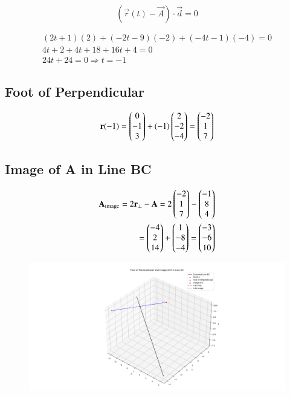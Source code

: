 \documentclass{article}
\begin{document}
$$(\vec{r}(t) - \vec{A}) \cdot \vec{d} = 0$$

\begin{align}
(2t + 1)(2) + (-2t - 9)(-2) + (-4t - 1)(-4) = 0 \\
4t + 2 + 4t + 18 + 16t + 4 = 0 \\
24t + 24 = 0 \Rightarrow t = -1
\end{align}

\subsection*{Foot of Perpendicular}
\begin{align}
\mathbf{r}(-1) = 
\begin{pmatrix}0 \\ -1 \\ 3\end{pmatrix}
+ (-1)
\begin{pmatrix}2 \\ -2 \\ -4\end{pmatrix}
=
\begin{pmatrix}-2 \\ 1 \\ 7\end{pmatrix}
\end{align}

\subsection*{Image of A in Line BC}
\begin{align}
\mathbf{A}_{\text{image}} = 2\mathbf{r}_{\perp} - \mathbf{A} =
2
\begin{pmatrix}-2 \\ 1 \\ 7\end{pmatrix}
-
\begin{pmatrix}-1 \\ 8 \\ 4\end{pmatrix}\\
=
\begin{pmatrix}-4 \\ 2 \\ 14\end{pmatrix}
+
\begin{pmatrix}1 \\ -8 \\ -4\end{pmatrix}
=
\begin{pmatrix}-3 \\ -6 \\ 10\end{pmatrix}
\end{align}

\begin{figure}[H]
    \centering
    \includegraphics[width=1\linewidth]{./figs/Figure_1.png}
    \caption{}
    \label{fig:fig1}
\end{figure}
\end{document}
